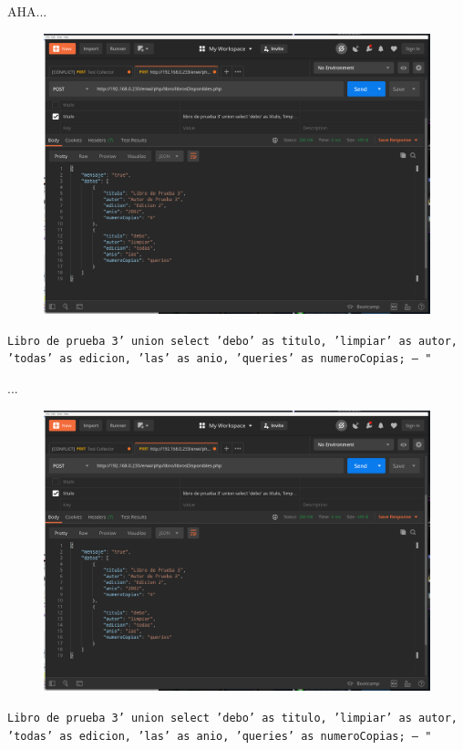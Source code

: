 \documentclass{beamer}
\begin{document}
\begin{frame}{AHA... }
    \centering
    
    \begin{figure}
        \centering
        \includegraphics[width=.7\textwidth]{fragments/pentest/pen1.png}
    \end{figure}
    \texttt{Libro de prueba 3' union select 'debo' as titulo, 'limpiar' as autor, 'todas' as edicion, 'las' as anio, 'queries' as numeroCopias; -- "}
\end{frame}


\begin{frame}{... }
    \centering
    
    \begin{figure}
        \centering
        \includegraphics[width=.7\textwidth]{fragments/pentest/pen1.png}
    \end{figure}
    \texttt{Libro de prueba 3' union select 'debo' as titulo, 'limpiar' as autor, 'todas' as edicion, 'las' as anio, 'queries' as numeroCopias; -- "}
\end{frame}
\end{document}
